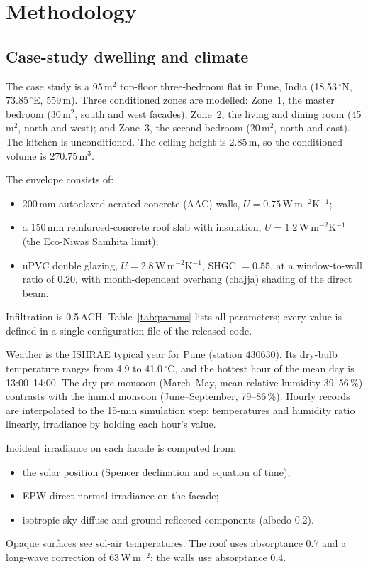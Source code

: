 \section{Methodology}\label{sec:methods}

\subsection{Case-study dwelling and climate}
The case study is a 95\,m$^2$ top-floor three-bedroom flat in Pune, India
(18.53\,$^\circ$N, 73.85\,$^\circ$E, 559\,m). Three conditioned zones are modelled:
Zone~1, the master bedroom (30\,m$^2$, south and west facades); Zone~2, the living and
dining room (45\,m$^2$, north and west); and Zone~3, the second bedroom (20\,m$^2$,
north and east). The kitchen is unconditioned. The ceiling height is 2.85\,m, so the
conditioned volume is 270.75\,m$^3$.

The envelope consists of:
\begin{itemize}
  \item 200\,mm autoclaved aerated concrete (AAC) walls, $U=0.75$\,W\,m$^{-2}$K$^{-1}$;
  \item a 150\,mm reinforced-concrete roof slab with insulation,
        $U=1.2$\,W\,m$^{-2}$K$^{-1}$ (the Eco-Niwas Samhita limit);
  \item uPVC double glazing, $U=2.8$\,W\,m$^{-2}$K$^{-1}$, SHGC $=0.55$, at a
        window-to-wall ratio of 0.20, with month-dependent overhang (chajja) shading
        of the direct beam.
\end{itemize}
Infiltration is 0.5\,ACH. Table~\ref{tab:params} lists all parameters; every value is
defined in a single configuration file of the released code.

Weather is the ISHRAE typical year for Pune (station 430630). Its dry-bulb temperature
ranges from 4.9 to 41.0\,$^\circ$C, and the hottest hour of the mean day is 13:00--14:00.
The dry pre-monsoon (March--May, mean relative humidity 39--56\,\%) contrasts with the
humid monsoon (June--September, 79--86\,\%). Hourly records are interpolated to the
15-min simulation step: temperatures and humidity ratio linearly, irradiance by holding
each hour's value.

Incident irradiance on each facade is computed from:
\begin{itemize}
  \item the solar position (Spencer declination and equation of time);
  \item EPW direct-normal irradiance on the facade;
  \item isotropic sky-diffuse and ground-reflected components (albedo 0.2).
\end{itemize}
Opaque surfaces see sol-air temperatures. The roof uses absorptance 0.7 and a long-wave
correction of 63\,W\,m$^{-2}$; the walls use absorptance 0.4.

